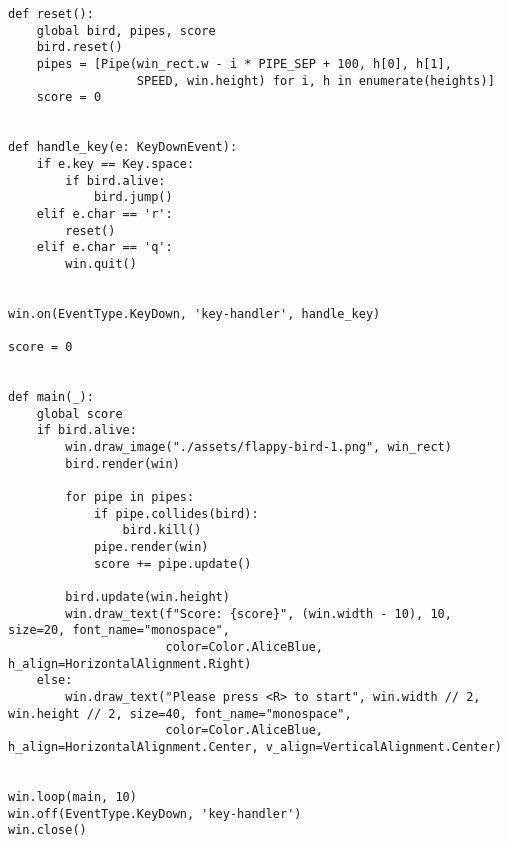 \documentclass[11pt]{article}
\begin{document}
\begin{lstlisting}
def reset():
    global bird, pipes, score
    bird.reset()
    pipes = [Pipe(win_rect.w - i * PIPE_SEP + 100, h[0], h[1],
                  SPEED, win.height) for i, h in enumerate(heights)]
    score = 0


def handle_key(e: KeyDownEvent):
    if e.key == Key.space:
        if bird.alive:
            bird.jump()
    elif e.char == 'r':
        reset()
    elif e.char == 'q':
        win.quit()


win.on(EventType.KeyDown, 'key-handler', handle_key)

score = 0


def main(_):
    global score
    if bird.alive:
        win.draw_image("./assets/flappy-bird-1.png", win_rect)
        bird.render(win)

        for pipe in pipes:
            if pipe.collides(bird):
                bird.kill()
            pipe.render(win)
            score += pipe.update()

        bird.update(win.height)
        win.draw_text(f"Score: {score}", (win.width - 10), 10, size=20, font_name="monospace",
                      color=Color.AliceBlue, h_align=HorizontalAlignment.Right)
    else:
        win.draw_text("Please press <R> to start", win.width // 2, win.height // 2, size=40, font_name="monospace",
                      color=Color.AliceBlue, h_align=HorizontalAlignment.Center, v_align=VerticalAlignment.Center)


win.loop(main, 10)
win.off(EventType.KeyDown, 'key-handler')
win.close()

\end{lstlisting}
\end{document}
